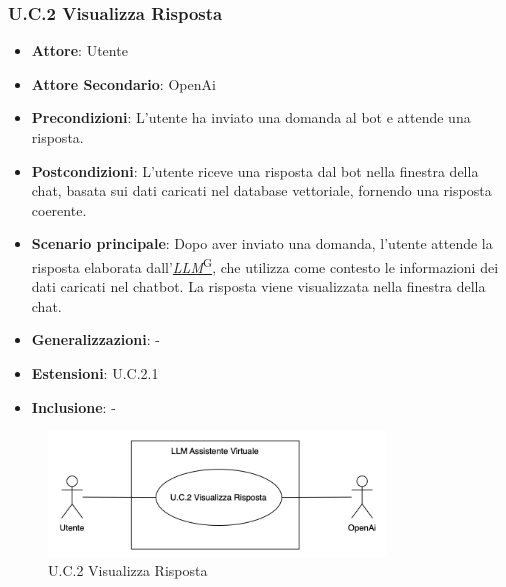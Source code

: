 \subsubsection{U.C.2 Visualizza Risposta}
\begin{itemize}
    \item \textbf{Attore}: Utente
    \item \textbf{Attore Secondario}: OpenAi
    \item \textbf{Precondizioni}:  L'utente ha inviato una domanda al bot e attende una risposta.
    \item \textbf{Postcondizioni}: L'utente riceve una risposta dal bot nella finestra della chat, basata sui dati caricati nel database vettoriale, fornendo una risposta coerente.
    \item \textbf{Scenario principale}: Dopo aver inviato una domanda, l'utente attende la risposta elaborata dall’\href{https://code7crusaders.github.io/docs/PB/documentazione_interna/glossario.html#llm-large-language-model}{\textit{LLM}\textsuperscript{G}}, che utilizza come contesto le informazioni dei dati caricati nel chatbot. La risposta viene visualizzata nella finestra della chat.
    \item \textbf{Generalizzazioni}: -
    \item \textbf{Estensioni}: U.C.2.1
    \item \textbf{Inclusione}: -
\end{itemize}
\begin{figure}[H]
    \centering
    \includegraphics[width=0.8\textwidth]{img/UC2.png}
    \caption{U.C.2 Visualizza Risposta}
\end{figure}
\newpage

